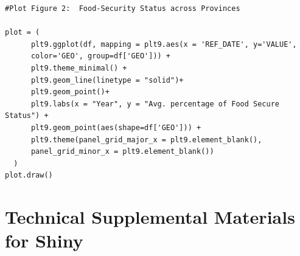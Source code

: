 \documentclass[11pt]{article}
\begin{document}
\begin{verbatim}
#Plot Figure 2:  Food-Security Status across Provinces

plot = (
      plt9.ggplot(df, mapping = plt9.aes(x = 'REF_DATE', y='VALUE', 
      color='GEO', group=df['GEO'])) +
      plt9.theme_minimal() +
      plt9.geom_line(linetype = "solid")+
      plt9.geom_point()+
      plt9.labs(x = "Year", y = "Avg. percentage of Food Secure Status") +
      plt9.geom_point(aes(shape=df['GEO'])) +
      plt9.theme(panel_grid_major_x = plt9.element_blank(), 
      panel_grid_minor_x = plt9.element_blank())
  )
plot.draw()
\end{verbatim}

\newpage
\section{Technical Supplemental Materials for Shiny}
\end{document}
